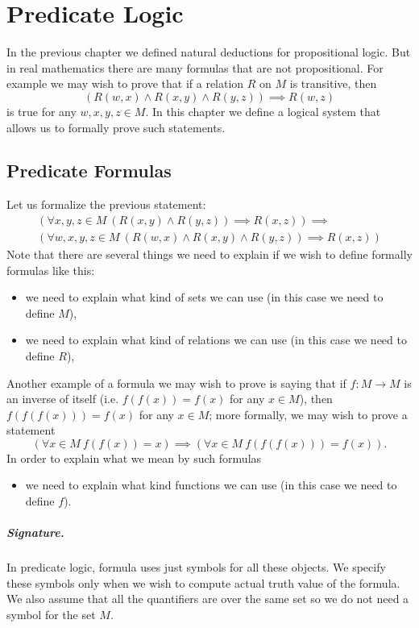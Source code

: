 \chapter{Predicate Logic}
In the previous chapter we defined natural deductions for propositional logic.
But in real mathematics there are many formulas that are not propositional. For
example we may wish to prove that if a relation $R$ on $M$ is transitive, then
\[
  (R(w, x) \land R(x, y) \land R(y, z)) \implies R(w, z)
\]
is true for any $w, x, y, z \in M$. In this chapter we define a logical
system that allows us to formally prove such statements.

\section{Predicate Formulas}
Let us formalize the previous statement:
\begin{multline*}
  (\forall x, y, z \in M ~ (R(x, y) \land R(y, z)) \implies R(x, z)) \implies \\
  (\forall w, x, y, z \in M ~ (R(w, x) \land R(x, y) \land R(y, z)) \implies
  R(x, z))
\end{multline*}
Note that there are several things we need to explain if we wish to define
formally formulas like this:
\begin{itemize}
  \item we need to explain what kind of sets we can use (in this case we need
    to define $M$),
  \item we need to explain what kind of relations we can use (in this case we
    need to define $R$),
\end{itemize}

Another example of a formula we may wish to prove is saying that if
$f : M \to M$ is an inverse of itself (i.e. $f(f(x)) = f(x)$ for any $x \in M$),
then $f(f(f(x))) = f(x)$ for any $x \in M$; more formally, we may wish to prove a
statement
\[
  (\forall x \in M ~ f(f(x)) = x) \implies
    (\forall x \in M ~ f(f(f(x))) = f(x)).
\]
In order to explain what we mean by such formulas
\begin{itemize}
  \item we need to explain what kind functions we can use (in this case we need
    to define $f$).
\end{itemize}

\paragraph{Signature.}
In predicate logic, formula uses just symbols for all these objects. We specify
these symbols only when we wish to compute actual truth value of the formula.
We also assume that all the quantifiers are over the same set so we do not need
a symbol for the set $M$.

